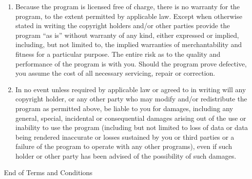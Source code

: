 \documentclass[a4paper,11pt,oneside]{book}
\begin{document}
\begin{enumerate}
	\begin{center}
		{\Large\sc
			No Warranty
		}
	\end{center}

	\item
	{\sc Because the program is licensed free of charge, there is no warranty
		for the program, to the extent permitted by applicable law.  Except when
		otherwise stated in writing the copyright holders and/or other parties
		provide the program ``as is'' without warranty of any kind, either expressed
		or implied, including, but not limited to, the implied warranties of
		merchantability and fitness for a particular purpose.  The entire risk as
		to the quality and performance of the program is with you.  Should the
		program prove defective, you assume the cost of all necessary servicing,
		repair or correction.}

	\item
	{\sc In no event unless required by applicable law or agreed to in writing
		will any copyright holder, or any other party who may modify and/or
		redistribute the program as permitted above, be liable to you for damages,
		including any general, special, incidental or consequential damages arising
		out of the use or inability to use the program (including but not limited
		to loss of data or data being rendered inaccurate or losses sustained by
		you or third parties or a failure of the program to operate with any other
		programs), even if such holder or other party has been advised of the
		possibility of such damages.}

\end{enumerate}


\begin{center}
	{\Large\sc End of Terms and Conditions}
\end{center}
\end{document}
